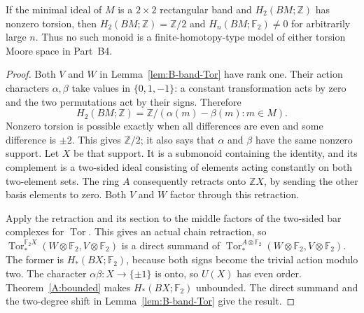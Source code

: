 \begin{proposition}\label{prop:B-K22-obstruction}
If the minimal ideal of $M$ is a $2\times2$ rectangular band and
$H_2(BM;\mathbb Z)$ has nonzero torsion, then
$H_2(BM;\mathbb Z)=\mathbb Z/2$ and
$H_n(BM;\mathbb F_2)\ne0$ for arbitrarily large $n$.
Thus no such monoid is a finite-homotopy-type model of either
torsion Moore space in Part~B4.
\end{proposition}
\begin{proof}
Both $V$ and $W$ in Lemma~\ref{lem:B-band-Tor} have rank one.
Their action characters $\alpha,\beta$ take values in
$\{0,1,-1\}$: a constant transformation acts by zero and the two
permutations act by their signs.  Therefore
\[
 H_2(BM;\mathbb Z)=
 \mathbb Z/(\alpha(m)-\beta(m):m\in M).
\]
Nonzero torsion is possible exactly when all differences are even
and some difference is $\pm2$.  This gives $\mathbb Z/2$;
it also says that $\alpha$ and $\beta$ have the same nonzero support.
Let $X$ be that support.  It is a submonoid containing the identity,
and its complement is a two-sided ideal consisting of elements acting
constantly on both two-element sets.  The ring $A$ consequently
retracts onto $\mathbb ZX$, by sending the other basis elements to
zero.  Both $V$ and $W$ factor through this retraction.

Apply the retraction and its section to the middle factors of the
two-sided bar complexes for $\operatorname{Tor}$.  This gives an
actual chain retraction, so
$\operatorname{Tor}^{\mathbb F_2X}_*(W\otimes\mathbb F_2,
V\otimes\mathbb F_2)$ is a direct summand of
$\operatorname{Tor}^{A\otimes\mathbb F_2}_*(W\otimes\mathbb F_2,
V\otimes\mathbb F_2)$.  The former is $H_*(BX;\mathbb F_2)$,
because both signs become the trivial action modulo two.
The character $\alpha\beta:X\to\{\pm1\}$ is onto, so
$U(X)$ has even order.  Theorem~\ref{A:bounded} makes
$H_*(BX;\mathbb F_2)$ unbounded.  The direct summand and the
two-degree shift in Lemma~\ref{lem:B-band-Tor} give the result.
\end{proof}

